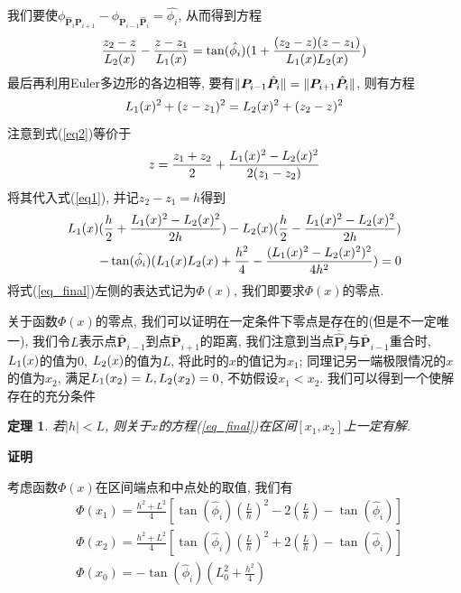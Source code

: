 \documentclass[utf8]{ctexart} %
\newtheorem{theorem}{\indent 定理}[section]
\numberwithin{figure}{section}
\numberwithin{equation}{section}
\begin{document}
	 
	  我们要使$\phi_{\hat{\boldsymbol{P}}_i\boldsymbol{P}_{i+1}}-\phi_{\boldsymbol{P}_{i-1}\hat{\boldsymbol{P}}_i}=\hat{\phi_i}$, 从而得到方程
	 \begin{equation}\label{eq1}
	 \frac{z_2-z}{\boldmath{L}_2(x)}-\frac{z-z_1}{\boldmath{L}_1(x)} = \tan(\hat{\phi_i})(1+\frac{(z_2-z)(z-z_1)}{\boldmath{L}_1(x)\boldmath{L}_2(x)})
	 \end{equation}
	 最后再利用Euler多边形的各边相等, 要有$\Arrowvert\boldsymbol{P}_{i-1}\hat{\boldsymbol{P}}_i\Arrowvert = \Arrowvert\boldsymbol{P}_{i+1}\hat{\boldsymbol{P}}_i\Arrowvert$, 则有方程
	 \begin{equation}\label{eq2}
	 \boldmath{L}_1(x)^2+(z-z_1)^2 =\boldmath{L}_2(x)^2+(z_2-z)^2
	 \end{equation}
	 注意到式(\ref{eq2})等价于
	 \begin{equation}
	 z = \frac{z_1+z_2}2+\frac{\boldmath{L}_1(x)^2-\boldmath{L}_2(x)^2}{2(z_1-z_2)}
	 \end{equation}
	 将其代入式(\ref{eq1}), 并记$z_2-z_1 = h$得到
	 \begin{equation}\label{eq_final}
	 \begin{aligned}
	 \boldmath{L}_1(x)(\frac h2+\frac{\boldmath{L}_1(x)^2-\boldmath{L}_2(x)^2}{2h})-\boldmath{L}_2(x)(\frac h2-\frac{\boldmath{L}_1(x)^2-\boldmath{L}_2(x)^2}{2h})\\
	 -\tan(\hat{\phi_i})(\boldmath{L}_1(x)\boldmath{L}_2(x)+\frac{h^2}4-\frac{(\boldmath{L}_1(x)^2-\boldmath{L}_2(x)^2)^2}{4h^2})=0
	 \end{aligned}
	 \end{equation}
	 将式(\ref{eq_final})左侧的表达式记为$\Phi(x)$, 我们即要求$\Phi(x)$的零点. \par 
	 关于函数$\Phi(x)$的零点, 我们可以证明在一定条件下零点是存在的(但是不一定唯一), 我们令$L$表示点$\bar{\boldsymbol{P}}_{i-1}$到点$\bar{\boldsymbol{P}}_{i+1}$的距离, 我们注意到当点$\bar{\hat{\boldsymbol{P}}}_i$与$\bar{\boldsymbol{P}}_{i-1}$重合时, $\boldmath{L}_1(x)$的值为0, $\boldmath{L}_2(x)$的值为$L$, 将此时的$x$的值记为$x_1$; 同理记另一端极限情况的$x$的值为$x_2$, 满足$\boldmath{L}_1(x_2)=L, \boldmath{L}_2(x_2)=0$, 不妨假设$x_1<x_2$. 我们可以得到一个使解存在的充分条件
	 \begin{theorem}
	 	若$|h|<L$, 则关于$x$的方程(\ref{eq_final})在区间$[x_1,x_2]$上一定有解. 
	 \end{theorem}
{\indent\bf 证明} \par 考虑函数$\Phi(x)$在区间端点和中点处的取值, 我们有
\begin{equation}
\begin{aligned}
&\Phi(x_1) = \frac{h^2+L^2}4[\tan(\hat{\phi}_i)(\frac Lh)^2-2(\frac Lh)-\tan(\hat{\phi}_i)]\\
&\Phi(x_2) = \frac{h^2+L^2}4[\tan(\hat{\phi}_i)(\frac Lh)^2+2(\frac Lh)-\tan(\hat{\phi}_i)]\\
&\Phi(x_0) = -\tan(\hat{\phi}_i)(L_0^2+\frac{h^2}4)
\end{aligned}
\end{equation}
\end{document}
